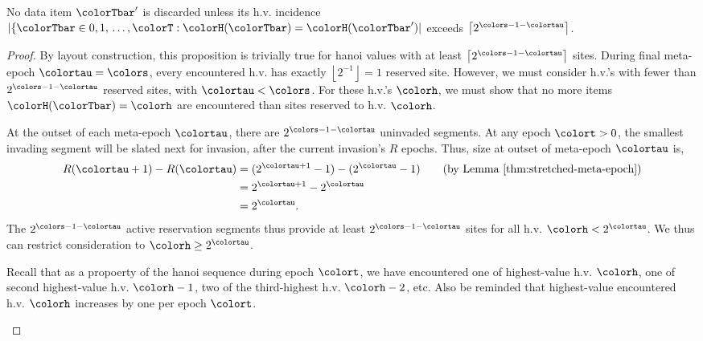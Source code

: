 \begin{lemma}
\label{thm:stretched-discarded-incidence-count}
No data item $\colorTbar'$ is discarded unless its h.v. incidence $|\{\colorTbar \in 0,1,\,\ldots,\colorT : \colorH(\colorTbar) = \colorH(\colorTbar')|$ exceeds $\left\lceil2^{\colors - 1 - \colortau}\right\rceil$.
\end{lemma}

\begin{proof}
By layout construction, this proposition is trivially true for hanoi values with at least $\left\lceil 2^{\colors-1-\colortau} \right\rceil$ sites.
During final meta-epoch $\colortau = \colors$, every encountered h.v. has exactly $\left\lfloor 2^{-1} \right\rfloor = 1$ reserved site.
However, we must consider h.v.'s with fewer than $2^{\colors-1-\colortau}$ reserved sites, with $\colortau < \colors$.
For these h.v.'s $\colorh$, we must show that no more items $\colorH(\colorTbar) = \colorh$ are encountered than sites reserved to h.v. $\colorh$.

\begin{proofpart}

At the outset of each meta-epoch $\colortau$, there are $2^{\colors - 1 - \colortau}$ uninvaded segments.
At any epoch $\colort>0$, the smallest invading segment will be slated next for invasion, after the current invasion's $R$ epochs.
Thus, size at outset of meta-epoch $\colortau$ is,
\begin{align*}
R(\colortau + 1) - R(\colortau)
&= (2^{\colortau + 1} - 1) - (2^{\colortau} - 1) \tag{by Lemma \ref{thm:stretched-meta-epoch}}\\
&= 2^{\colortau + 1} - 2^{\colortau}\\
&= 2^{\colortau}.
\end{align*}
The $2^{\colors - 1 - \colortau}$ active reservation segments thus provide at least $2^{\colors - 1 - \colortau}$ sites for all h.v. $\colorh < 2^{\colortau}$.
We thus can restrict consideration to $\colorh \geq 2^{\colortau}$.
\end{proofpart}

\begin{proofpart}
Recall that as a propoerty of the hanoi sequence during epoch $\colort$, we have encountered one of highest-value h.v. $\colorh$, one of second highest-value h.v. $\colorh-1$, two of the third-highest h.v. $\colorh-2$, etc.
Also be reminded that highest-value encountered h.v. $\colorh$ increases by one per epoch $\colort$.


\end{proofpart}
\end{proof}
